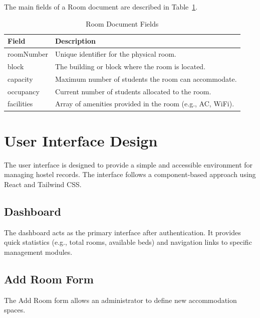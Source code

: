 The main fields of a Room document are described in Table~\ref{tab:roomfields}.

\begin{table}[H]
\centering
\caption{Room Document Fields}
\label{tab:roomfields}
\begin{tabular}{p{} p{}}
\toprule
\textbf{Field} & \textbf{Description} \\
\midrule
roomNumber & Unique identifier for the physical room. \\
block & The building or block where the room is located. \\
capacity & Maximum number of students the room can accommodate. \\
occupancy & Current number of students allocated to the room. \\
facilities & Array of amenities provided in the room (e.g., AC, WiFi). \\
\bottomrule
\end{tabular}
\end{table}

\section{User Interface Design}

The user interface is designed to provide a simple and accessible environment for managing hostel records. The interface follows a component-based approach using React and Tailwind CSS.

\subsection{Dashboard}

The dashboard acts as the primary interface after authentication. It provides quick statistics (e.g., total rooms, available beds) and navigation links to specific management modules.

\subsection{Add Room Form}

The Add Room form allows an administrator to define new accommodation spaces. 

